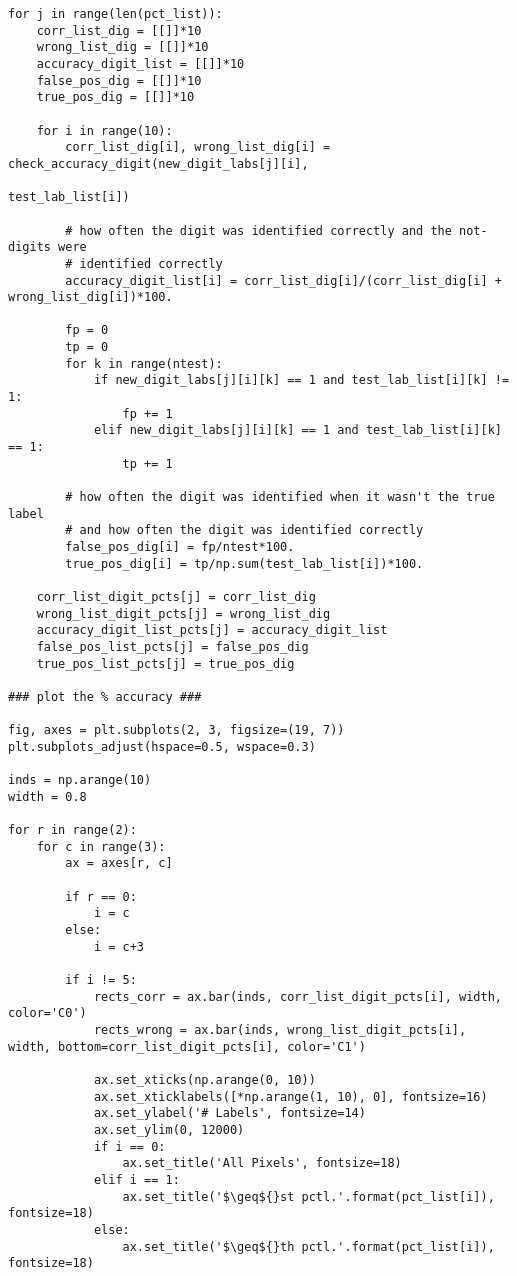 \documentclass[10pt]{article}
\begin{document}
\begin{lstlisting}
for j in range(len(pct_list)):
    corr_list_dig = [[]]*10
    wrong_list_dig = [[]]*10
    accuracy_digit_list = [[]]*10
    false_pos_dig = [[]]*10
    true_pos_dig = [[]]*10

    for i in range(10):
        corr_list_dig[i], wrong_list_dig[i] = check_accuracy_digit(new_digit_labs[j][i],
                                                                   test_lab_list[i])

        # how often the digit was identified correctly and the not-digits were
        # identified correctly
        accuracy_digit_list[i] = corr_list_dig[i]/(corr_list_dig[i] + wrong_list_dig[i])*100.
        
        fp = 0
        tp = 0
        for k in range(ntest):
            if new_digit_labs[j][i][k] == 1 and test_lab_list[i][k] != 1:
                fp += 1
            elif new_digit_labs[j][i][k] == 1 and test_lab_list[i][k] == 1:
                tp += 1
    
        # how often the digit was identified when it wasn't the true label
        # and how often the digit was identified correctly
        false_pos_dig[i] = fp/ntest*100.
        true_pos_dig[i] = tp/np.sum(test_lab_list[i])*100.
    
    corr_list_digit_pcts[j] = corr_list_dig
    wrong_list_digit_pcts[j] = wrong_list_dig
    accuracy_digit_list_pcts[j] = accuracy_digit_list
    false_pos_list_pcts[j] = false_pos_dig
    true_pos_list_pcts[j] = true_pos_dig

### plot the % accuracy ###

fig, axes = plt.subplots(2, 3, figsize=(19, 7))
plt.subplots_adjust(hspace=0.5, wspace=0.3)

inds = np.arange(10)
width = 0.8

for r in range(2):
    for c in range(3):
        ax = axes[r, c]
        
        if r == 0:
            i = c
        else:
            i = c+3
        
        if i != 5:  
            rects_corr = ax.bar(inds, corr_list_digit_pcts[i], width, color='C0')
            rects_wrong = ax.bar(inds, wrong_list_digit_pcts[i], width, bottom=corr_list_digit_pcts[i], color='C1')

            ax.set_xticks(np.arange(0, 10))
            ax.set_xticklabels([*np.arange(1, 10), 0], fontsize=16)
            ax.set_ylabel('# Labels', fontsize=14)
            ax.set_ylim(0, 12000)
            if i == 0:
                ax.set_title('All Pixels', fontsize=18)
            elif i == 1:
                ax.set_title('$\geq${}st pctl.'.format(pct_list[i]), fontsize=18)
            else:
                ax.set_title('$\geq${}th pctl.'.format(pct_list[i]), fontsize=18)


\end{lstlisting}
\end{document}
